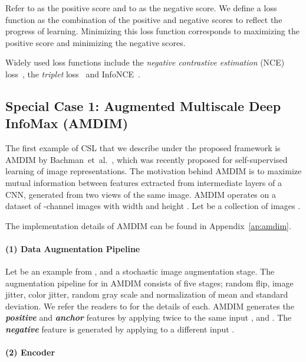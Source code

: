 \documentclass{article}
\begin{document}
Refer to  as the positive score and to  as the negative score. We define a loss function as the combination of the positive and negative scores to reflect the progress of learning. Minimizing this loss function corresponds to maximizing the positive score and minimizing the negative scores. 

Widely used loss functions include the \textit{negative contrastive estimation} (NCE) loss~\cite{mnih2013learning}, the \textit{triplet} loss~\cite{schroff2015facenet} and InfoNCE~\cite{henaff2019data}.


\subsection{Special Case 1: Augmented Multiscale Deep InfoMax (AMDIM)} \label{sec: amdim}

The first example of CSL that we describe under the proposed framework is AMDIM by Bachman~et~al.~\cite{bachman2019learning}, which was recently proposed for self-supervised learning of image representations. The motivation behind AMDIM is to maximize mutual information between features extracted from intermediate layers of a CNN, generated from two views of the same image. AMDIM operates on a dataset of -channel images with width  and height . Let  be a collection of images .

The implementation details of AMDIM can be found in Appendix~\ref{ap:amdim}.

\paragraph{(1) Data Augmentation Pipeline}

Let  be an example from , and  a stochastic image augmentation stage. The augmentation pipeline for  in AMDIM consists of five stages; random flip, image jitter, color jitter, random gray scale and normalization of mean and standard deviation. We refer the readers to \cite{bachman2019learning} for the details of each. AMDIM generates the \textbf{\textit{positive}}  and \textbf{\textit{anchor}}  features by applying  twice to the same input ,  and . The \textbf{\textit{negative}}  feature is generated by applying  to a different input .

\paragraph{(2) Encoder}
\end{document}

